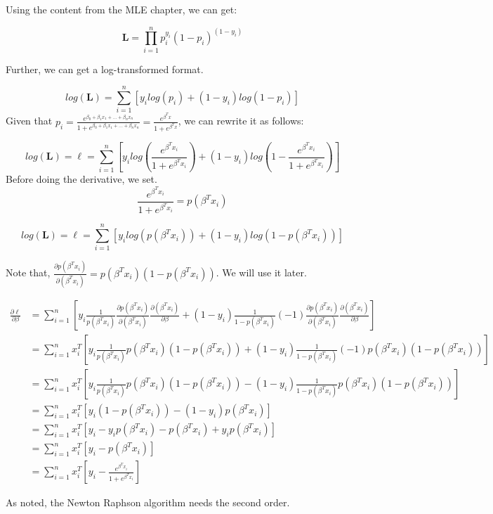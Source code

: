 \documentclass[]{book}
\begin{document}
Using the content from the MLE chapter, we can get:

\[\mathbf{L}=\prod_{i=1}^{n} p_i^{ y_i}(1-p_i)^{(1-y_i)}\]

Further, we can get a log-transformed format.

\[log (\mathbf{L})=\sum_{i=1}^{n}[y_i log (p_i) + (1-y_i) log(1-p_i)]\]
Given that
\(p_i=\frac{e^{\beta_0+\beta_1x_1+...+\beta_nx_n}}{1+e^{\beta_0+\beta_1x_1+...+\beta_nx_n}}=\frac{e^{\beta^Tx}}{1+e^{\beta^Tx}}\),
we can rewrite it as follows:

\[log (\mathbf{L})=\ell=\sum_{i=1}^{n}[y_i log (\frac{e^{\beta^Tx_i}}{1+e^{\beta^Tx_i}}) + (1-y_i) log(1-\frac{e^{\beta^Tx_i}}{1+e^{\beta^Tx_i}})]\]
Before doing the derivative, we set.
\[\frac{e^{\beta^Tx_i}}{1+e^{\beta^Tx_i}} = p(\beta ^T x_i)\]

\[log (\mathbf{L})=\ell=\sum_{i=1}^{n}[y_i log (p(\beta ^T x_i)) + (1-y_i) log(1-p(\beta ^T x_i))]\]

Note that,
\(\frac{\partial p(\beta ^T x_i)}{\partial (\beta ^T x_i)} = p(\beta ^T x_i)(1-p(\beta ^T x_i))\).
We will use it later.

\[\begin{aligned}
\frac{\partial \ell} {\partial \beta} &= \sum_{i=1}^{n} [y_i \frac{1}{p(\beta ^T x_i)} \frac{\partial p(\beta ^T x_i)}{\partial (\beta ^T x_i)}\frac{\partial (\beta ^T x_i)}{\partial \beta}+(1-y_i) \frac{1}{1-p(\beta ^T x_i)}(-1)\frac{\partial p(\beta ^T x_i)}{\partial (\beta ^T x_i)}\frac{\partial (\beta ^T x_i)}{\partial \beta}] \\
&= \sum_{i=1}^{n} x_i^T[y_i \frac{1}{p(\beta ^T x_i)} p(\beta ^T x_i)(1-p(\beta ^T x_i))+(1-y_i) \frac{1}{1-p(\beta ^T x_i)}(-1)p(\beta ^T x_i)(1-p(\beta ^T x_i))] \\
&= \sum_{i=1}^{n} x_i^T[y_i \frac{1}{p(\beta ^T x_i)} p(\beta ^T x_i)(1-p(\beta ^T x_i))-(1-y_i) \frac{1}{1-p(\beta ^T x_i)}p(\beta ^T x_i)(1-p(\beta ^T x_i))] \\
&= \sum_{i=1}^{n} x_i^T[y_i (1-p(\beta ^T x_i))-(1-y_i) p(\beta ^T x_i)] \\
&=\sum_{i=1}^{n} x_i^T[y_i-y_ip(\beta ^T x_i)-p(\beta ^T x_i)+y_i p(\beta ^T x_i)] \\
&=\sum_{i=1}^{n} x_i^T[y_i-p(\beta ^T x_i)] \\
&= \sum_{i=1}^{n} x_i^T[y_i-\frac{e^{\beta^Tx_i}}{1+e^{\beta^Tx_i}}]
\end{aligned}\]

As noted, the Newton Raphson algorithm needs the second order.
\end{document}

